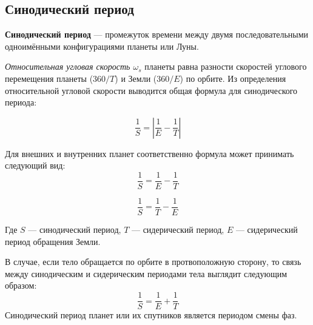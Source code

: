 \subsection{Синодический период}

{\sffamily \bfseries Синодический период} --- промежуток времени между двумя последовательными одноимёнными конфигурациями планеты или Луны.

\textit{Относительная угловая скорость $\mathit{\omega_s}$} планеты равна разности скоростей углового перемещения планеты ($360/T$) и Земли ($360/E$) по орбите. Из определения относительной угловой скорости выводится общая формула для синодического периода:

\begin{equation}
\frac1S=\left|\frac1E-\frac1T\right|
\end{equation}

Для внешних и внутренних планет соответственно формула может принимать следующий вид:
\begin{equation}\frac1S=\frac1E-\frac1T
\end{equation}

\begin{equation}\frac1S=\frac1T-\frac1E
\end{equation}

Где $S$ --- синодический период, $T$ --- сидерический период, $E$ --- сидерический период обращения Земли.

В случае, если тело обращается по орбите в протвоположную сторону, то связь между синодическим и сидерическим периодами тела выглядит следующим образом:
\begin{equation}\frac1S=\frac1E+\frac1T
\end{equation}
Синодический период планет или их спутников является периодом смены фаз. 